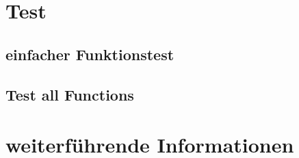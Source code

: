 \section{Test}

\subsection{einfacher Funktionstest }

\subsection{Test all Functions}



\section{weiterführende Informationen}

